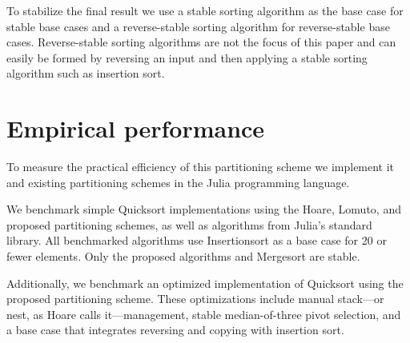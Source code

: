 \documentclass{juliacon}
\begin{document}
To stabilize the final result we use a stable sorting algorithm as the base case for stable base cases and a reverse-stable sorting algorithm for reverse-stable base cases. Reverse-stable sorting algorithms are not the focus of this paper and can easily be formed by reversing an input and then applying a stable sorting algorithm such as insertion sort.

\section{Empirical performance}

To measure the practical efficiency of this partitioning scheme we implement it and existing partitioning schemes in the Julia \cite{julia} programming language.

We benchmark simple Quicksort implementations using the Hoare, Lomuto, and proposed partitioning schemes, as well as algorithms from Julia's standard library. All benchmarked algorithms use Insertionsort as a base case for 20 or fewer elements. Only the proposed algorithms and Mergesort are stable.

Additionally, we benchmark an optimized implementation of Quicksort using the proposed partitioning scheme. These optimizations include manual stack---or nest, as Hoare calls it---management, stable median-of-three pivot selection, and a base case that integrates reversing and copying with insertion sort.

\vspace{8pt}


\vspace{8pt}
\end{document}
